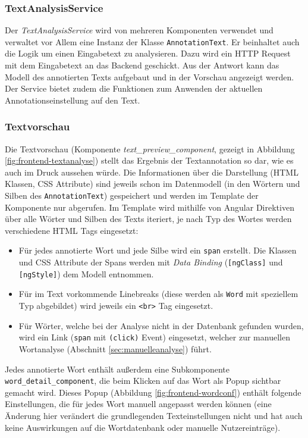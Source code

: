 \subsubsection{TextAnalysisService}

Der \textit{TextAnalysisService} wird von mehreren Komponenten verwendet und verwaltet vor Allem eine Instanz der Klasse \texttt{AnnotationText}. Er beinhaltet auch die Logik um einen Eingabetext zu analysieren. Dazu wird ein HTTP Request mit dem Eingabetext an das Backend geschickt. Aus der Antwort kann das Modell des annotierten Texts aufgebaut und in der Vorschau angezeigt werden. Der Service bietet zudem die Funktionen zum Anwenden der aktuellen Annotationseinstellung auf den Text.

\subsubsection{Textvorschau}

Die Textvorschau (Komponente \textit{text\_preview\_component}, gezeigt in Abbildung \ref{fig:frontend-textanalyse}) stellt das Ergebnis der Textannotation so dar, wie es auch im Druck aussehen würde. Die Informationen über die Darstellung (HTML Klassen, CSS Attribute) sind jeweils schon im Datenmodell (in den Wörtern und Silben des \texttt{AnnotationText}) gespeichert und werden im Template der Komponente nur abgerufen. Im Template wird mithilfe von Angular Direktiven über alle Wörter und Silben des Texts iteriert, je nach Typ des Wortes werden verschiedene HTML Tags eingesetzt:
\begin{itemize}
	\item Für jedes annotierte Wort und jede Silbe wird ein \texttt{span} erstellt. Die Klassen und CSS Attribute der  Spans werden mit \textit{Data Binding} (\texttt{[ngClass]} und \texttt{[ngStyle]}) dem Modell entnommen.
	
	\item Für im Text vorkommende Linebreaks (diese werden als \texttt{Word} mit speziellem Typ abgebildet) wird jeweils ein \texttt{<br>} Tag eingesetzt.
	
	\item Für Wörter, welche bei der Analyse nicht in der Datenbank gefunden wurden, wird ein Link (\texttt{span} mit \texttt{(click)} Event) eingesetzt, welcher zur manuellen Wortanalyse (Abschnitt \ref{sec:manuelleanalyse}) führt.
\end{itemize}

Jedes annotierte Wort enthält außerdem eine Subkomponente \texttt{word\_detail\_component}, die beim Klicken auf das Wort als Popup sichtbar gemacht wird. Dieses Popup (Abbildung \ref{fig:frontend-wordconf}) enthält folgende Einstellungen, die für jedes Wort manuell angepasst werden können (eine Änderung hier verändert die grundlegenden Texteinstellungen nicht und hat auch keine Auswirkungen auf die Wortdatenbank oder manuelle Nutzereinträge).

